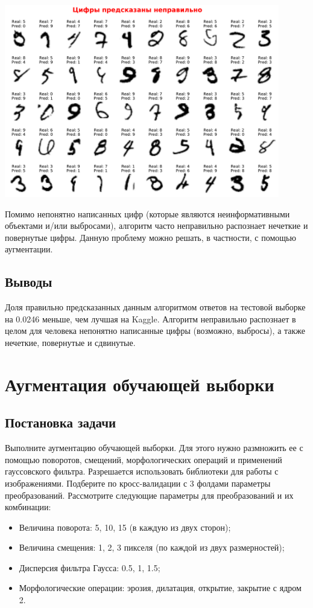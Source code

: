 \documentclass{article}
\begin{document}
\begin{center}
\includegraphics[width=12cm]{TASK1 PRAC FIGURE 4-3.pdf}
\end{center}

Помимо непонятно написанных цифр (которые являются неинформативными объектами и/или выбросами), алгоритм часто неправильно распознает нечеткие и повернутые цифры. Данную проблему можно решать, в частности, с помощью аугментации.

\subsection{Выводы}
Доля правильно предсказанных данным алгоритмом ответов на тестовой выборке на 0.0246 меньше, чем лучшая на Kaggle. Алгоритм неправильно распознает в целом для человека непонятно написанные цифры (возможно, выбросы), а также нечеткие, повернутые и сдвинутые.


\section{Аугментация обучающей выборки}

\subsection{Постановка задачи}
Выполните аугментацию обучающей выборки. Для этого нужно размножить ее с помощью поворотов, смещений, морфологических операций и применений гауссовского фильтра. Разрешается использовать библиотеки для работы с изображениями. Подберите по кросс-валидации с 3 фолдами параметры преобразований. Рассмотрите следующие параметры для преобразований и их комбинации:
\begin{itemize}
    \item Величина поворота: 5, 10, 15 (в каждую из двух сторон);
    \item Величина смещения: 1, 2, 3 пикселя (по каждой из двух размерностей);
    \item Дисперсия фильтра Гаусса: 0.5, 1, 1.5;
    \item Морфологические операции: эрозия, дилатация, открытие, закрытие с ядром 2.
\end{itemize}
\end{document}
